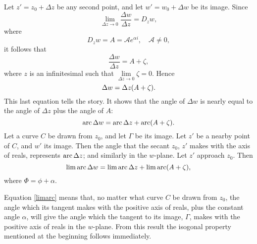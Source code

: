 \documentclass[twosided]{memoir}
\begin{document}
\begin{figure}[htbp]
\centering
{}
\end{figure}
Let $z'=z_0+\Delta z$ be any second point, and let $w'=w_0+\Delta w$ be its image. Since
\[
\lim\limits_{\Delta z \to 0} \frac{\Delta w}{\Delta z} =D_zw
,\] where
\[
	D_zw=A=\mathcal{A}e^{\alpha  i}, \quad \mathcal{A}\neq 0
,\] it follows that
\[
\frac{\Delta w}{\Delta z} =A+\zeta
,\] where $z$ is an infinitesimal such that $\lim\limits_{\Delta z \to 0} \zeta = 0$. Hence
\begin{equation}\label{delw}
	\Delta w=\Delta z\pbr*{A+\zeta}.
\end{equation}
This last equation tells the story. It shows that the angle of $\Delta w$ is nearly equal to the angle of $\Delta z$ plus the angle of $A$:
\[
	\Arc \Delta w=\Arc \Delta z+\Arc\pbr*{A+\zeta} 
.\] Let a curve $C$ be drawn from $z_0$, and let $\Gamma$ be its image. Let $z'$ be a nearby point of $C$, and $w'$ its image. Then the angle that the secant $z_0$, $z'$ makes with the axis of reals, represents $\operatorname{arc} \Delta z$; and similarly in the $w$-plane. Let $z'$ approach $z_0$. Then
\begin{equation}\label{limarc}
	\lim \Arc \Delta w=\lim \Arc \Delta z+\lim \Arc \pbr*{A+\zeta},
\end{equation}
where $\Phi=\phi+\alpha $.


Equation \ref{limarc} means that, no matter what curve $C$ be drawn from $z_0$, the angle which its tangent makes with the positive axis of reals, plus the constant angle $\alpha $, will give the angle which the tangent to its image, $\Gamma$, makes with the positive axis of reals in the $w$-plane. From this result the isogonal property mentioned at the beginning follows immediately. 
\end{document}
